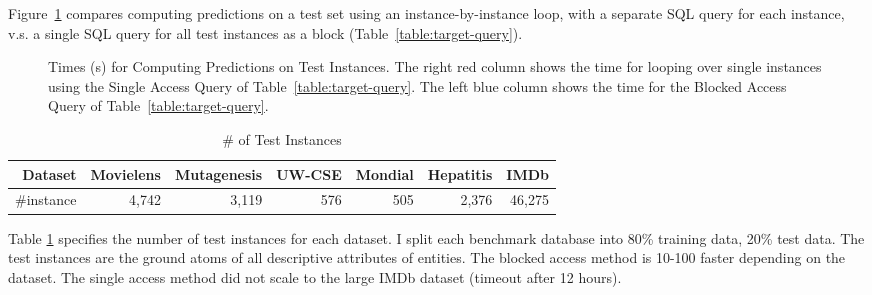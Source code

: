 \documentclass{sfuthesis}
\begin{document}
Figure~\ref{fig:test-timing} compares computing predictions on a test set using an instance-by-instance loop, with a separate SQL query for each instance, v.s. a single SQL query for all test instances as a block (Table~\ref{table:target-query}). 


\begin{figure}[h] %
 \centering
{} 
\caption{Times (s) for Computing Predictions on Test Instances. The right red column shows the time for looping over single instances using the Single Access Query of Table~\ref{table:target-query}. The left blue column shows the time for the Blocked Access Query of Table~\ref{table:target-query}.
}
 \label{fig:test-timing}
\end{figure}



\begin{table}[!h]
\caption{\# of Test Instances }
  \centering
  \begin{tabular}{|r|r|r|r|r|r|r|} \hline
\textbf{Dataset}&Movielens&	Mutagenesis	& 	UW-CSE	&	Mondial&	Hepatitis&	 	IMDb \\ \hline
{\#instance}	&4,742	 	&	3,119		&576	&		505&2,376	 	&46,275 \\ \hline
    
\end{tabular}%
  \label{tab:test-instance}%
\end{table}%
Table \ref{tab:test-instance} specifies the number of  test instances for each dataset. I  split each benchmark database into  80\% training data, 20\% test data. The test instances are the ground atoms of all descriptive attributes of entities.  The blocked access method is 10-100 faster depending on the dataset. The single access method did not scale to the large IMDb dataset (timeout after 12 hours).
\end{document}
